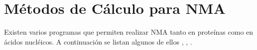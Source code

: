 \section{M\'{e}todos de C\'{a}lculo para NMA}

Existen varios programas que permiten realizar NMA tanto en prote\'{i}nas como en \'{a}cidos nucl\'{e}icos. A continuaci\'{o}n se listan algunos de ellos \cite{Ramon}, \cite{Zimmermann2011}, \cite{Eyal2015}.\\

